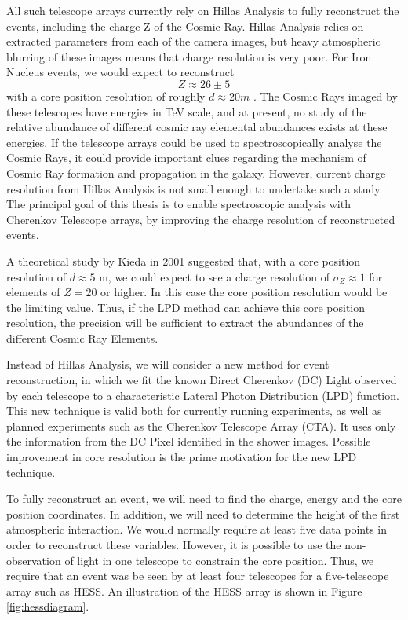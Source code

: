 \documentclass[11pt]{article}
\begin{document}
All such telescope arrays currently rely on Hillas Analysis to fully reconstruct the events, including the  charge Z of the Cosmic Ray. Hillas Analysis relies on extracted parameters from each of the camera images, but heavy atmospheric blurring of these images means that charge resolution is very poor. For Iron Nucleus events, we would expect to reconstruct \[Z \approx 26 \pm 5 \] with a core position resolution of roughly $d \approx 20 m $ \cite{hess07}. The Cosmic Rays imaged by these telescopes have energies in TeV scale, and at present, no study of the relative abundance of different cosmic ray elemental abundances exists at these energies. If the telescope arrays could be used to spectroscopically analyse the Cosmic Rays, it could provide important clues regarding the mechanism of Cosmic Ray formation and propagation in the galaxy. However, current charge resolution from Hillas Analysis is not small enough to undertake such a study. The principal goal of this thesis is to enable spectroscopic analysis with Cherenkov Telescope arrays, by improving the charge resolution of reconstructed events.

A theoretical study by Kieda in 2001 \cite{kieda01} suggested that, with a core position resolution of $d \approx 5 $ m, we could expect to see a charge resolution of $ \sigma_{Z} \approx 1 $ for elements of $Z = 20$ or higher. In this case the core position resolution would be the limiting value. Thus, if the LPD method can achieve this core position resolution, the precision will be sufficient to extract the abundances of the different Cosmic Ray Elements. 

Instead of Hillas Analysis, we will consider a new method for event reconstruction, in which we fit the known Direct Cherenkov (DC) Light observed by each telescope to a characteristic Lateral Photon Distribution (LPD) function. This new technique is valid both for currently running experiments, as well as planned experiments such as the Cherenkov Telescope Array (CTA). It uses only the information from the DC Pixel identified in the shower images. Possible improvement in core resolution is the prime motivation for the new LPD technique.

To fully reconstruct an event, we will need to find the charge, energy and the core position coordinates. In addition, we will need to determine the height of the first atmospheric interaction. We would normally require at least five data points in order to reconstruct these variables. However, it is possible to use the non-observation of light in one telescope to constrain the core position. Thus, we require that an event was be seen by at least four telescopes for a five-telescope array such as HESS. An illustration of the HESS array is shown in Figure \ref{fig:hessdiagram}.
\end{document}
